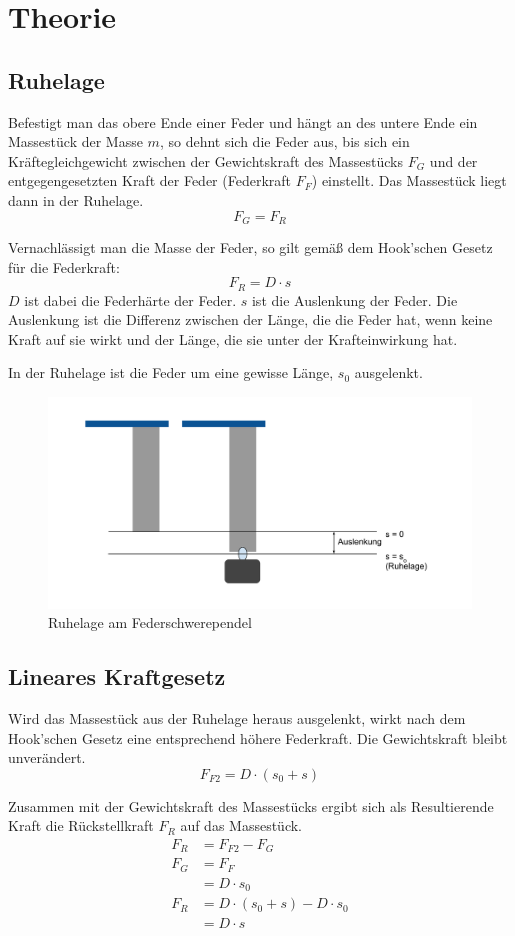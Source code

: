 \chapter{Theorie}
\section{Ruhelage}
Befestigt man das obere Ende einer Feder und hängt an des untere Ende ein Massestück der Masse $m$, so dehnt sich die Feder aus, bis sich ein Kräftegleichgewicht zwischen der Gewichtskraft des Massestücks $F_G$ und der entgegengesetzten Kraft der Feder (Federkraft $F_F$) einstellt. Das Massestück liegt dann in der Ruhelage.
$$F_G = F_R $$

Vernachlässigt man die Masse der Feder, so gilt gemäß dem Hook'schen Gesetz für die Federkraft:
$$F_R = D \cdot s$$
$D$ ist dabei die Federhärte der Feder.
$s$ ist die Auslenkung der Feder. Die Auslenkung ist die Differenz zwischen der Länge, die die Feder hat, wenn keine Kraft auf sie wirkt und der Länge, die sie unter der Krafteinwirkung hat.

In der Ruhelage ist die Feder um eine gewisse Länge, $s_0$ ausgelenkt.

\begin{figure}[H]
\centering
\includegraphics[width=\textwidth]{img/ruhelage.pdf}
\caption{Ruhelage am Federschwerependel}
\end{figure}

\section{Lineares Kraftgesetz}
Wird das Massestück aus der Ruhelage heraus ausgelenkt, wirkt nach dem Hook'schen Gesetz eine entsprechend höhere Federkraft. Die Gewichtskraft bleibt unverändert.
$$F_{F2} = D \cdot (s_0 + s)$$

Zusammen mit der Gewichtskraft des Massestücks ergibt sich als Resultierende Kraft die Rückstellkraft $F_R$ auf das Massestück.
\begin{align*}
F_R &= F_{F2} - F_G \\
F_G &= F_F \\
    &= D \cdot s_0 \\
F_R &= D \cdot (s_0 + s) - D \cdot s_0 \\
    &= D \cdot s
\end{align*}

